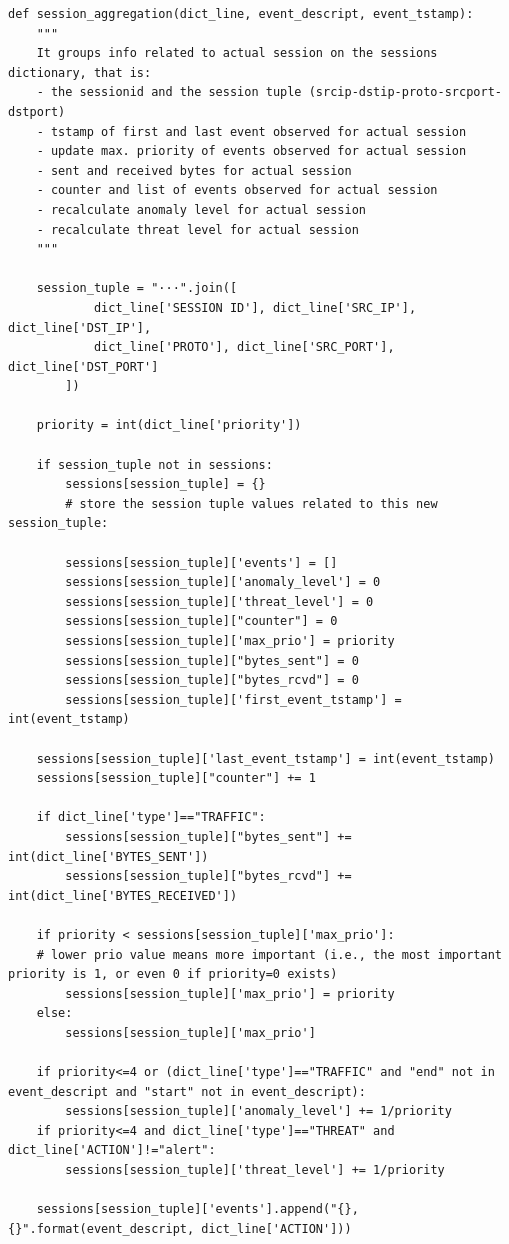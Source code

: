 \begin{verbatim}
def session_aggregation(dict_line, event_descript, event_tstamp):
    """
    It groups info related to actual session on the sessions dictionary, that is:
    - the sessionid and the session tuple (srcip-dstip-proto-srcport-dstport)
    - tstamp of first and last event observed for actual session
    - update max. priority of events observed for actual session
    - sent and received bytes for actual session
    - counter and list of events observed for actual session
    - recalculate anomaly level for actual session
    - recalculate threat level for actual session
    """

    session_tuple = "···".join([
            dict_line['SESSION ID'], dict_line['SRC_IP'], dict_line['DST_IP'],
            dict_line['PROTO'], dict_line['SRC_PORT'], dict_line['DST_PORT']
        ])

    priority = int(dict_line['priority'])

    if session_tuple not in sessions:
        sessions[session_tuple] = {}
        # store the session tuple values related to this new session_tuple:

        sessions[session_tuple]['events'] = []
        sessions[session_tuple]['anomaly_level'] = 0
        sessions[session_tuple]['threat_level'] = 0
        sessions[session_tuple]["counter"] = 0
        sessions[session_tuple]['max_prio'] = priority
        sessions[session_tuple]["bytes_sent"] = 0
        sessions[session_tuple]["bytes_rcvd"] = 0
        sessions[session_tuple]['first_event_tstamp'] = int(event_tstamp)

    sessions[session_tuple]['last_event_tstamp'] = int(event_tstamp)
    sessions[session_tuple]["counter"] += 1

    if dict_line['type']=="TRAFFIC":
        sessions[session_tuple]["bytes_sent"] += int(dict_line['BYTES_SENT'])
        sessions[session_tuple]["bytes_rcvd"] += int(dict_line['BYTES_RECEIVED'])

    if priority < sessions[session_tuple]['max_prio']:
    # lower prio value means more important (i.e., the most important priority is 1, or even 0 if priority=0 exists)
        sessions[session_tuple]['max_prio'] = priority
    else:
        sessions[session_tuple]['max_prio']

    if priority<=4 or (dict_line['type']=="TRAFFIC" and "end" not in event_descript and "start" not in event_descript):
        sessions[session_tuple]['anomaly_level'] += 1/priority
    if priority<=4 and dict_line['type']=="THREAT" and dict_line['ACTION']!="alert":
        sessions[session_tuple]['threat_level'] += 1/priority

    sessions[session_tuple]['events'].append("{}, {}".format(event_descript, dict_line['ACTION']))
\end{verbatim}

